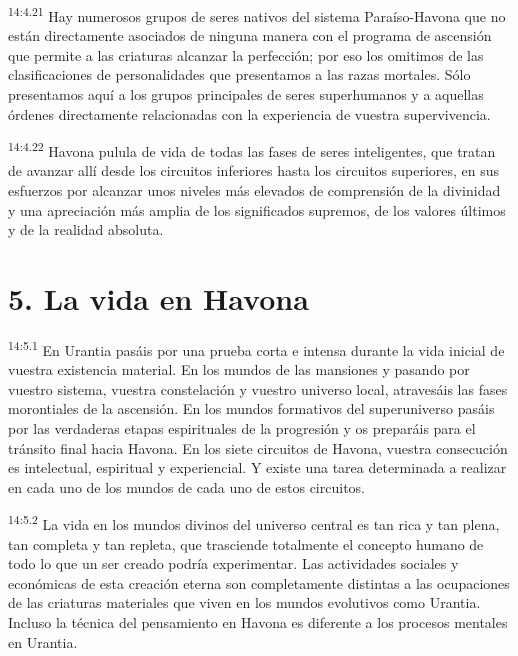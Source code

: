 \par
\textsuperscript{14:4.21} Hay numerosos grupos de seres nativos del sistema Paraíso-Havona que no están directamente asociados de ninguna manera con el programa de ascensión que permite a las criaturas alcanzar la perfección; por eso los omitimos de las clasificaciones de personalidades que presentamos a las razas mortales. Sólo presentamos aquí a los grupos principales de seres superhumanos y a aquellas órdenes directamente relacionadas con la experiencia de vuestra supervivencia.

\par
\textsuperscript{14:4.22} Havona pulula de vida de todas las fases de seres inteligentes, que tratan de avanzar allí desde los circuitos inferiores hasta los circuitos superiores, en sus esfuerzos por alcanzar unos niveles más elevados de comprensión de la divinidad y una apreciación más amplia de los significados supremos, de los valores últimos y de la realidad absoluta.

\section*{5. La vida en Havona}
\par
\textsuperscript{14:5.1} En Urantia pasáis por una prueba corta e intensa durante la vida inicial de vuestra existencia material. En los mundos de las mansiones y pasando por vuestro sistema, vuestra constelación y vuestro universo local, atravesáis las fases morontiales de la ascensión. En los mundos formativos del superuniverso pasáis por las verdaderas etapas espirituales de la progresión y os preparáis para el tránsito final hacia Havona. En los siete circuitos de Havona, vuestra consecución es intelectual, espiritual y experiencial. Y existe una tarea determinada a realizar en cada uno de los mundos de cada uno de estos circuitos.

\par
\textsuperscript{14:5.2} La vida en los mundos divinos del universo central es tan rica y tan plena, tan completa y tan repleta, que trasciende totalmente el concepto humano de todo lo que un ser creado podría experimentar. Las actividades sociales y económicas de esta creación eterna son completamente distintas a las ocupaciones de las criaturas materiales que viven en los mundos evolutivos como Urantia. Incluso la técnica del pensamiento en Havona es diferente a los procesos mentales en Urantia.

